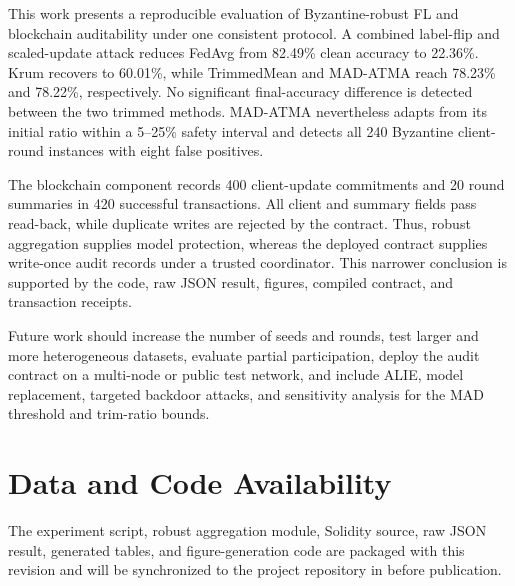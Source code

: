 \documentclass[10pt,letterpaper]{article}
\begin{document}
This work presents a reproducible evaluation of Byzantine-robust FL and
blockchain auditability under one consistent protocol. A combined label-flip
and scaled-update attack reduces FedAvg from 82.49\% clean accuracy to 22.36\%.
Krum recovers to 60.01\%, while TrimmedMean and MAD-ATMA reach 78.23\% and
78.22\%, respectively. No significant final-accuracy difference is detected
between the two trimmed methods. MAD-ATMA nevertheless adapts from its initial
ratio within a 5--25\% safety interval and detects all 240 Byzantine
client-round instances with eight false positives.

The blockchain component records 400 client-update commitments and 20 round
summaries in 420 successful transactions. All client and summary fields pass
read-back, while duplicate writes are rejected by the contract. Thus, robust
aggregation supplies model protection, whereas the deployed contract supplies
write-once audit records under a trusted coordinator. This narrower conclusion
is supported by the code, raw JSON result, figures, compiled contract, and
transaction receipts.

Future work should increase the number of seeds and rounds, test larger and
more heterogeneous datasets, evaluate partial participation, deploy the audit
contract on a multi-node or public test network, and include ALIE, model
replacement, targeted backdoor attacks, and sensitivity analysis for the MAD
threshold and trim-ratio bounds.

\section*{Data and Code Availability}

The experiment script, robust aggregation module, Solidity source, raw JSON
result, generated tables, and figure-generation code are packaged with this
revision and will be synchronized to the project repository in
\cite{repository2026} before publication.
\end{document}
